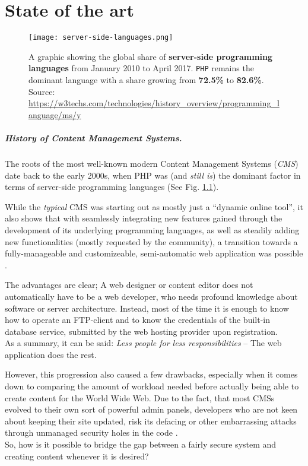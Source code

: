 \chapter{State of the art}
\label{cha:state-of-the-art}

\begin{figure}[p]
    \centering
    \texttt{[image: server-side-languages.png]}
    \caption{A graphic showing the global share of \textbf{server-side programming languages} from January 2010 to April 2017. \texttt{PHP} remains the dominant language with a share growing from \textbf{72.5\%} to \textbf{82.6\%}.\\
    Source: \url{https://w3techs.com/technologies/history_overview/programming_language/ms/y}}
    \label{fig:server-side-languages}
\end{figure}
%

\paragraph{History of Content Management Systems.}
The roots of the most well-known modern Content Management Systems (\emph{CMS}) date back to the early 2000s, when PHP was (and \emph{still is}) the dominant factor in terms of server-side programming languages (See Fig. \ref{fig:server-side-languages}). %

While the \emph{typical} CMS was starting out as mostly just a ``dynamic online tool'', it also shows that with seamlessly integrating new features gained through the development of its underlying programming languages, as well as steadily adding new functionalities (mostly requested by the community), a transition towards a fully-manageable and customizeable, semi-automatic web application was possible \cite[17]{dhillon2016}.

The advantages are clear; A web designer or content editor does not automatically have to be a web developer, who needs profound knowledge about software or server architecture. Instead, most of the time it is enough to know how to operate an FTP-client and to know the credentials of the built-in database service, submitted by the web hosting provider upon registration.\\
As a summary, it can be said: \emph{Less people for less responsibilities} -- The web application does the rest.

However, this progression also caused a few drawbacks, especially when it comes down to comparing the amount of workload needed before actually being able to create content for the World Wide Web. Due to the fact, that most CMSs evolved to their own sort of powerful admin panels, developers who are not keen about keeping their site updated, risk its defacing or other embarrassing attacks through unmanaged security holes in the code \cite[23]{dhillon2016}.\\
So, how is it possible to bridge the gap between a fairly secure system and creating content whenever it is desired?

